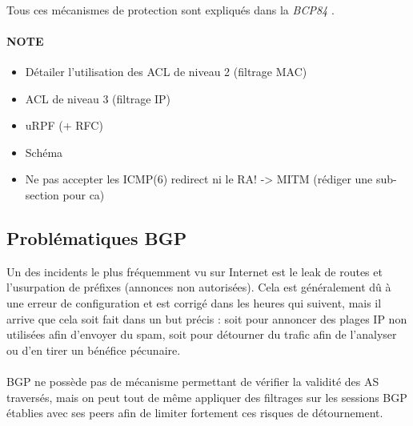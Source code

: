 \paragraph{}
Tous ces mécanismes de protection sont expliqués dans la \emph{BCP84} \cite{fenioux:BCP84}.


\paragraph{NOTE}
\begin{itemize}
\item Détailer l'utilisation des ACL de niveau 2 (filtrage MAC)
\item ACL de niveau 3 (filtrage IP) 
\item uRPF (+ RFC)
\item Schéma
\item Ne pas accepter les ICMP(6) redirect ni le RA! -> MITM (rédiger une sub-section pour ca)
\end{itemize}


\subsection{Problématiques BGP}

Un des incidents le plus fréquemment vu sur Internet est le leak de routes et l'usurpation de préfixes (annonces non autorisées). Cela est généralement dû à une erreur de configuration et est corrigé dans les heures qui suivent, mais il arrive que cela soit fait dans un but précis : soit pour annoncer des plages IP non utilisées afin d'envoyer du spam, soit pour détourner du trafic afin de l'analyser ou d'en tirer un bénéfice pécunaire.

\paragraph{}
BGP ne possède pas de mécanisme permettant de vérifier la validité des AS traversés, mais on peut tout de même appliquer des filtrages sur les sessions BGP établies avec ses peers afin de limiter fortement ces risques de détournement.

